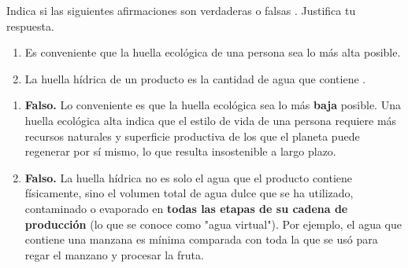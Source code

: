 {
	Indica si las siguientes afirmaciones son verdaderas o falsas . Justifica tu respuesta.
	\begin{enumerate}[label=\textbf{\alph*)}]
		\item Es conveniente que la huella ecológica de una persona sea lo más alta posible.
		\item La huella hídrica de un producto es la cantidad de agua que contiene .
	\end{enumerate}
}

\begin{solution}
	\begin{enumerate}[label=\textbf{\alph*)}]
		\item \textbf{Falso.} Lo conveniente es que la huella ecológica sea lo más \textbf{baja} posible. Una huella ecológica alta indica que el estilo de vida de una persona requiere más recursos naturales y superficie productiva de los que el planeta puede regenerar por sí mismo, lo que resulta insostenible a largo plazo.
		\item \textbf{Falso.} La huella hídrica no es solo el agua que el producto contiene físicamente, sino el volumen total de agua dulce que se ha utilizado, contaminado o evaporado en \textbf{todas las etapas de su cadena de producción} (lo que se conoce como "agua virtual"). Por ejemplo, el agua que contiene una manzana es mínima comparada con toda la que se usó para regar el manzano y procesar la fruta.
	\end{enumerate}
\end{solution}
